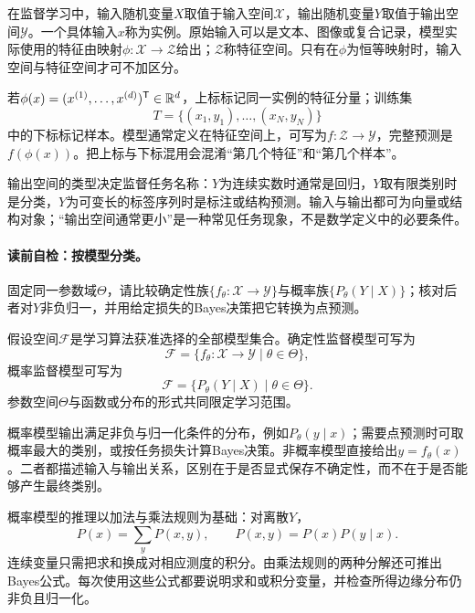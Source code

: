 在监督学习中，输入随机变量$X$取值于输入空间$\mathcal X$，输出随机变量$Y$取值于输出空间$\mathcal Y$。一个具体输入$x$称为实例。原始输入可以是文本、图像或复合记录，模型实际使用的特征由映射$\phi:\mathcal X\to\mathcal Z$给出；$\mathcal Z$称特征空间。只有在$\phi$为恒等映射时，输入空间与特征空间才可不加区分。

若$\phi(x)=(x^{(1)},\ldots,x^{(d)})^{\mathsf T}\in\mathbb{R}^d$，上标标记同一实例的特征分量；训练集
\[
T=\{(x_1,y_1),\ldots,(x_N,y_N)\}
\]
中的下标标记样本。模型通常定义在特征空间上，可写为$f:\mathcal Z\to\mathcal Y$，完整预测是$f(\phi(x))$。把上标与下标混用会混淆“第几个特征”和“第几个样本”。

输出空间的类型决定监督任务名称：$Y$为连续实数时通常是回归，$Y$取有限类别时是分类，$Y$为可变长的标签序列时是标注或结构预测。输入与输出都可为向量或结构对象；“输出空间通常更小”是一种常见任务现象，不是数学定义中的必要条件。


\paragraph{读前自检：按模型分类。}固定同一参数域$\Theta$，请比较确定性族$\{f_\theta:\mathcal X\to\mathcal Y\}$与概率族$\{P_\theta(Y\mid X)\}$；核对后者对$Y$非负归一，并用给定损失的Bayes决策把它转换为点预测。\par

\begin{definition}[假设空间]\label{def:V1-C09-hypothesis-space}
假设空间$\mathcal F$是学习算法获准选择的全部模型集合。确定性监督模型可写为
\[
\mathcal F=\{f_\theta:\mathcal X\to\mathcal Y\mid\theta\in\Theta\},
\]
概率监督模型可写为
\[
\mathcal F=\{P_\theta(Y\mid X)\mid\theta\in\Theta\}.
\]
参数空间$\Theta$与函数或分布的形式共同限定学习范围。
\end{definition}

概率模型输出满足非负与归一化条件的分布，例如$P_\theta(y\mid x)$；需要点预测时可取概率最大的类别，或按任务损失计算Bayes决策。非概率模型直接给出$y=f_\theta(x)$。二者都描述输入与输出关系，区别在于是否显式保存不确定性，而不在于是否能够产生最终类别。

概率模型的推理以加法与乘法规则为基础：对离散$Y$，
\[
P(x)=\sum_y P(x,y),\qquad P(x,y)=P(x)P(y\mid x).
\]
连续变量只需把求和换成对相应测度的积分。由乘法规则的两种分解还可推出Bayes公式。每次使用这些公式都要说明求和或积分变量，并检查所得边缘分布仍非负且归一化。

